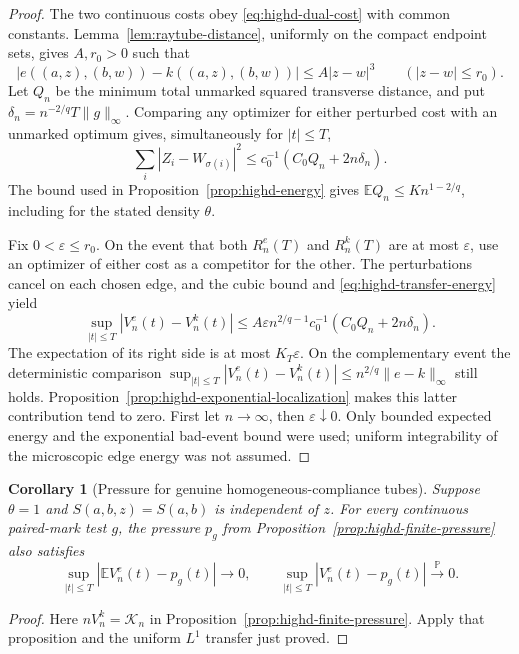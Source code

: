 \documentclass[11pt,reqno]{amsart}
\newtheorem{corollary}[theorem]{Corollary}
\theoremstyle{definition}
\theoremstyle{remark}
\numberwithin{equation}{section}
\newcommand{\E}{\mathbb E}
\newcommand{\Pp}{\mathbb P}
\begin{document}
\begin{proof}
The two continuous costs obey \eqref{eq:highd-dual-cost} with
common constants. Lemma~\ref{lem:raytube-distance}, uniformly on
the compact endpoint sets, gives \(A,r_0>0\) such that
\[
|e((a,z),(b,w))-k((a,z),(b,w))|
 \le A|z-w|^3\qquad(|z-w|\le r_0).
\]
Let \(Q_n\) be the minimum total unmarked squared transverse
distance, and put \(\delta_n=n^{-2/q}T\|g\|_\infty\).
Comparing any optimizer for either perturbed cost with
an unmarked optimum gives, simultaneously for \(|t|\le T\),
\begin{equation}
\sum_i|Z_i-W_{\sigma(i)}|^2
 \le c_0^{-1}(C_0Q_n+2n\delta_n).
\label{eq:highd-transfer-energy}
\end{equation}
The bound used in Proposition~\ref{prop:highd-energy} gives
\(\E Q_n\le K n^{1-2/q}\), including for the stated
density \(\theta\).

Fix \(0<\varepsilon\le r_0\). On the event that both
\(R_n^e(T)\) and \(R_n^k(T)\) are at most \(\varepsilon\),
use an optimizer of either cost as a competitor for the other.
The perturbations cancel on each chosen edge, and the cubic bound
and \eqref{eq:highd-transfer-energy} yield
\[
\sup_{|t|\le T}|V_n^e(t)-V_n^k(t)|
 \le A\varepsilon n^{2/q-1}c_0^{-1}
       (C_0Q_n+2n\delta_n).
\]
The expectation of its right side is at most \(K_T\varepsilon\).
On the complementary event the deterministic comparison
\(\sup_{|t|\le T}|V_n^e(t)-V_n^k(t)|
 \le n^{2/q}\|e-k\|_\infty\)
still holds. Proposition~\ref{prop:highd-exponential-localization}
makes this latter contribution tend to zero. First let
\(n\to\infty\), then \(\varepsilon\downarrow0\).
Only bounded expected energy and the exponential bad-event bound
were used; uniform integrability of the microscopic edge energy
was not assumed.
\end{proof}

\begin{corollary}[Pressure for genuine homogeneous-compliance tubes]
\label{cor:highd-length-pressure}
Suppose \(\theta=1\) and \(S(a,b,z)=S(a,b)\) is independent
of \(z\). For every continuous paired-mark test \(g\), the
pressure \(p_g\) from Proposition~\ref{prop:highd-finite-pressure}
also satisfies
\[
\sup_{|t|\le T}|\E V_n^e(t)-p_g(t)|\longrightarrow0,
\qquad
\sup_{|t|\le T}|V_n^e(t)-p_g(t)|\xrightarrow{\Pp}0.
\]
\end{corollary}

\begin{proof}
Here \(nV_n^k=\mathcal K_n\) in
Proposition~\ref{prop:highd-finite-pressure}. Apply that proposition
and the uniform \(L^1\) transfer just proved.
\end{proof}
\end{document}
